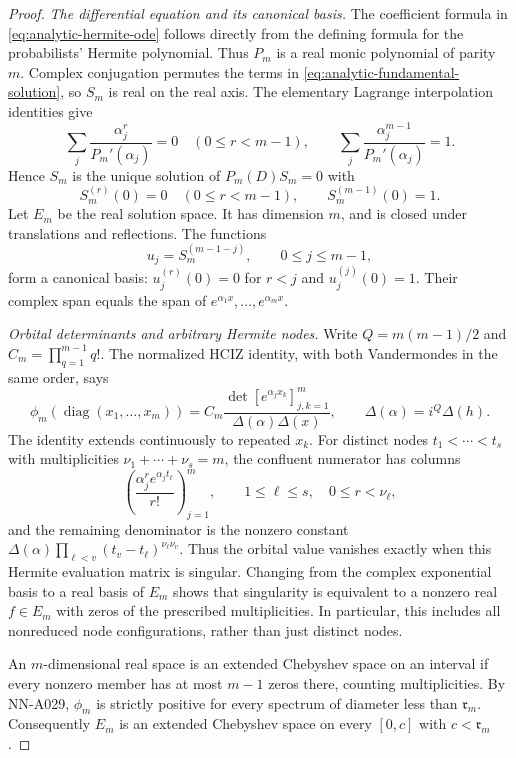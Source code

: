 \begin{proof}
\emph{The differential equation and its canonical basis.}
The coefficient formula in \eqref{eq:analytic-hermite-ode} follows
directly from the defining formula for the probabilists' Hermite
polynomial. Thus $P_m$ is a real monic polynomial of parity $m$.
Complex conjugation permutes the terms in
\eqref{eq:analytic-fundamental-solution}, so $S_m$ is real on the
real axis. The elementary Lagrange interpolation identities give
\[
 \sum_j\frac{\alpha_j^r}{P_m'(\alpha_j)}=0
       \quad(0\le r<m-1),\qquad
 \sum_j\frac{\alpha_j^{m-1}}{P_m'(\alpha_j)}=1.
\]
Hence $S_m$ is the unique solution of $P_m(D)S_m=0$ with
\[
 S_m^{(r)}(0)=0\quad(0\le r<m-1),\qquad
 S_m^{(m-1)}(0)=1.
\]
Let $E_m$ be the real solution space. It has dimension $m$, and is
closed under translations and reflections. The functions
\[
 u_j=S_m^{(m-1-j)},\qquad 0\le j\le m-1,
\]
form a canonical basis: $u_j^{(r)}(0)=0$ for $r<j$ and
$u_j^{(j)}(0)=1$. Their complex span equals the span of
$e^{\alpha_1x},\ldots,e^{\alpha_mx}$.

\emph{Orbital determinants and arbitrary Hermite nodes.}
Write $Q=m(m-1)/2$ and $C_m=\prod_{q=1}^{m-1}q!$. The normalized
HCIZ identity, with both Vandermondes in the same order, says
\begin{equation}\label{eq:analytic-confluent-hciz}
 \phi_m(\operatorname{diag}(x_1,\ldots,x_m))
 =C_m\frac{\det[e^{\alpha_jx_k}]_{j,k=1}^m}
               {\Delta(\alpha)\Delta(x)},
 \qquad \Delta(\alpha)=i^Q\Delta(h).
\end{equation}
The identity extends continuously to repeated $x_k$. For distinct
nodes $t_1<\cdots<t_s$ with multiplicities $\nu_1+\cdots+\nu_s=m$,
the confluent numerator has columns
\[
 \left(\frac{\alpha_j^r e^{\alpha_jt_\ell}}{r!}\right)_{j=1}^m,
 \qquad 1\le\ell\le s,\quad0\le r<\nu_\ell,
\]
and the remaining denominator is the nonzero constant
$\Delta(\alpha)\prod_{\ell<v}(t_v-t_\ell)^{\nu_\ell\nu_v}$.
Thus the orbital value vanishes exactly when this Hermite
evaluation matrix is singular. Changing from the complex
exponential basis to a real basis of $E_m$ shows that singularity
is equivalent to a nonzero real $f\in E_m$ with zeros of the
prescribed multiplicities. In particular, this includes all
nonreduced node configurations, rather than just distinct nodes.

An $m$-dimensional real space is an extended Chebyshev space on an
interval if every nonzero member has at most $m-1$ zeros there,
counting multiplicities. By NN-A029, $\phi_m$ is strictly positive
for every spectrum of diameter less than $\mathfrak r_m$.
Consequently $E_m$ is an extended Chebyshev space on every
$[0,c]$ with $c<\mathfrak r_m$.


\end{proof}
